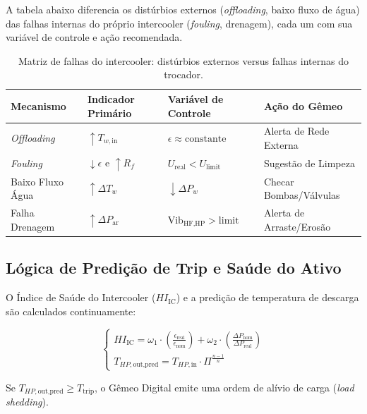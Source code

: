 \documentclass[12pt,a4paper]{article}
\numberwithin{equation}{section}
\numberwithin{table}{section}
\numberwithin{figure}{section}
\begin{document}
	A tabela abaixo diferencia os distúrbios externos (\textit{offloading}, baixo fluxo de água) das falhas internas do próprio intercooler (\textit{fouling}, drenagem), cada um com sua variável de controle e ação recomendada.
	\begin{table}[h!]
		\centering
		\small
		\renewcommand{\arraystretch}{1.5}
		\begin{tabular}{|l|l|l|l|}
			\hline
			\textbf{Mecanismo} & \textbf{Indicador Primário} & \textbf{Variável de Controle} & \textbf{Ação do Gêmeo} \\ \hline
			\textit{Offloading} & $\uparrow T_{w,\text{in}}$ & $\epsilon \approx \text{constante}$ & Alerta de Rede Externa \\ \hline
			\textit{Fouling} & $\downarrow \epsilon$ e $\uparrow R_f$ & $U_{\text{real}} < U_{\text{limit}}$ & Sugestão de Limpeza \\ \hline
			Baixo Fluxo Água & $\uparrow \Delta T_{w}$ & $\downarrow \Delta P_{w}$ & Checar Bombas/Válvulas \\ \hline
			Falha Drenagem & $\uparrow \Delta P_{\text{ar}}$ & $\text{Vib}_{\text{HF,HP}} > \text{limit}$ & Alerta de Arraste/Erosão \\ \hline
		\end{tabular}
		\caption{Matriz de falhas do intercooler: distúrbios externos versus falhas internas do trocador.}
	\end{table}
	
	\subsection{\textbf{Lógica de Predição de Trip e Saúde do Ativo}}
	O Índice de Saúde do Intercooler ($HI_{\text{IC}}$) e a predição de temperatura de descarga são calculados continuamente:
	
	\begin{equation}\label{eq:s10-10}
	\begin{cases}
		HI_{\text{IC}} = \omega_1 \cdot \left( \frac{\epsilon_{\text{real}}}{\epsilon_{\text{nom}}} \right) + \omega_2 \cdot \left( \frac{\Delta P_{\text{nom}}}{\Delta P_{\text{real}}} \right) \\[10pt]
		T_{HP,\text{out,pred}} = T_{HP,\text{in}} \cdot \Pi^{\frac{n-1}{n}}
	\end{cases}
\end{equation}
	
	Se $T_{HP,\text{out,pred}} \ge T_{\text{trip}}$, o Gêmeo Digital emite uma ordem de alívio de carga (\textit{load shedding}).
\end{document}
